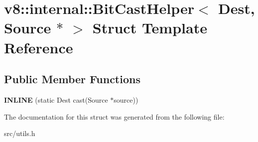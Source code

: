 \hypertarget{structv8_1_1internal_1_1_bit_cast_helper_3_01_dest_00_01_source_01_5_01_4}{}\section{v8\+:\+:internal\+:\+:Bit\+Cast\+Helper$<$ Dest, Source $\ast$ $>$ Struct Template Reference}
\label{structv8_1_1internal_1_1_bit_cast_helper_3_01_dest_00_01_source_01_5_01_4}
\subsection*{Public Member Functions}
\begin{DoxyCompactItemize}
\item 
\hypertarget{structv8_1_1internal_1_1_bit_cast_helper_3_01_dest_00_01_source_01_5_01_4_aa253022f15b09c032583c87b8817d353}{}{\bfseries I\+N\+L\+I\+N\+E} (static Dest cast(Source $\ast$source))\label{structv8_1_1internal_1_1_bit_cast_helper_3_01_dest_00_01_source_01_5_01_4_aa253022f15b09c032583c87b8817d353}

\end{DoxyCompactItemize}


The documentation for this struct was generated from the following file\+:\begin{DoxyCompactItemize}
\item 
src/utils.\+h\end{DoxyCompactItemize}
